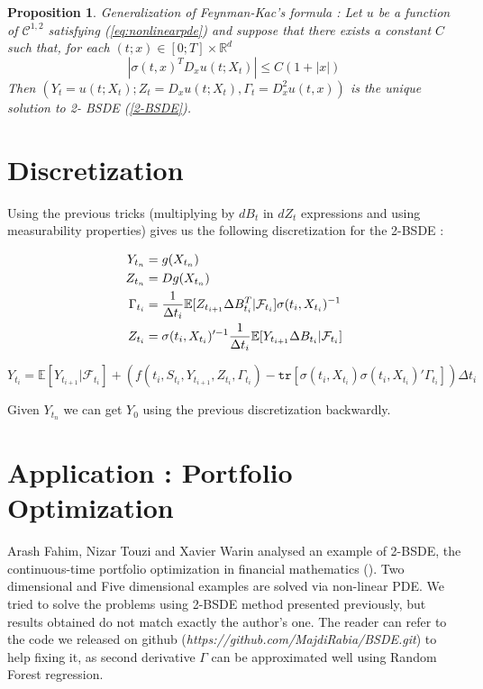 \documentclass[english,11pt,openany]{report}
\theoremstyle{definition}
\theoremstyle{plain}
\newtheorem{Prop}[Th]{Proposition}
\theoremstyle{definition}
\begin{document}
\begin{Prop}
	Generalization of Feynman-Kac's formula : \newline
	Let $u$ be a function of $\mathcal{C}^{1,2}$ satisfying (\ref{eq:nonlinearpde}) and suppose that there exists a
	constant $C$ such that, for each $(t; x) \in [0; T] \times \mathbb{R}^d$
	\begin{equation}
	|\sigma(t,x)^T D_xu(t;X_t)|\leq C(1 + |x|)
	\end{equation}
	Then $(Y_t = u(t;X_t);Z_t = D_xu(t;X_t), \Gamma_t = D^2_xu(t,x))$ is the unique solution to 2-
	BSDE (\ref{2-BSDE}).
\end{Prop} 


\section{Discretization}

Using the previous tricks (multiplying by $dB_t$ in $dZ_t$ expressions and using measurability properties) gives us the following discretization for the 2-BSDE : 

\begin{align}
Y_{t_n} &= g(X_{t_n}) \notag \\
Z_{t_n} &= Dg(X_{t_n}) \notag \\
\Gamma_{t_i} &= \frac{1}{\Delta t_i}\mathbb{E}[Z_{t_{i + 1}} \Delta B_{t_i}^T  | \mathcal{F}_{t_i}]\sigma(t_i, X_{t_i})^{-1} \notag \\
Z_{t_i} &= \sigma(t_i, X_{t_i})'^{-1}\frac{1}{\Delta t_i}\mathbb{E}[Y_{t_{i + 1}} \Delta B_{t_i}  | \mathcal{F}_{t_i}] \notag 
\end{align}


	
	\begin{displaymath}
	Y_{t_i} = \mathbb{E}[Y_{t_{i + 1}} | \mathcal{F}_{t_i}] +  (f(t_i,S_{t_i}, Y_{t_{i + 1}}, Z_{t_i}, \Gamma_{t_i}) - \mathtt{tr}[\sigma(t_i, X_{t_i}) \sigma(t_i, X_{t_i})'\Gamma_{t_i}])\Delta t_i
	\end{displaymath}


Given $Y_{t_n}$ we can get $Y_0$ using the previous discretization backwardly. 

\section{Application : Portfolio Optimization}

Arash Fahim, Nizar Touzi and Xavier Warin analysed an example of 2-BSDE, the continuous-time portfolio optimization in financial mathematics (\cite{touzi:2bsdesimulation}). 
Two dimensional and Five dimensional examples are solved via non-linear PDE. We tried to solve the problems using 2-BSDE method presented previously, but results obtained do not match exactly the author's one. The reader can refer to the code we released on github  (\textit{https://github.com/MajdiRabia/BSDE.git}) to help fixing it, as second derivative $\Gamma$ can be approximated well using Random Forest regression.
\end{document}
